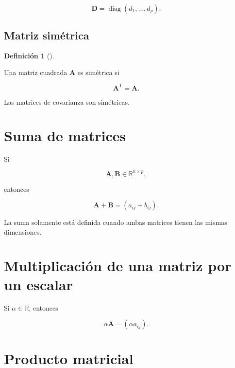 \documentclass[
  spanish,
  10.5pt,
  letterpaper,
  DIV=11,
  numbers=noendperiod,
  oneside,
  open=any]{scrreprt}
\theoremstyle{definition}
\newtheorem{definition}{Definición}[chapter]
\theoremstyle{definition}
\theoremstyle{plain}
\theoremstyle{remark}
\begin{document}
\[
\mathbf{D}
=
\operatorname{diag}(d_1,\ldots,d_p).
\]

\subsection*{Matriz simétrica}\label{matriz-simuxe9trica}

\begin{definition}[]\protect\hypertarget{def-matriz-simetrica}{}\label{def-matriz-simetrica}

Una matriz cuadrada \(\mathbf{A}\) es simétrica si

\[
\mathbf{A}^{\mathsf T}=\mathbf{A}.
\]

\end{definition}

Las matrices de covarianza son simétricas.

\section*{Suma de matrices}\label{suma-de-matrices}


Si

\[
\mathbf{A},\mathbf{B}\in\mathbb{R}^{n\times p},
\]

entonces

\[
\mathbf{A}+\mathbf{B}
=
(a_{ij}+b_{ij}).
\]

La suma solamente está definida cuando ambas matrices tienen las mismas
dimensiones.

\section*{Multiplicación de una matriz por un
escalar}\label{multiplicaciuxf3n-de-una-matriz-por-un-escalar}


Si \(\alpha\in\mathbb{R}\), entonces

\[
\alpha\mathbf{A}
=
(\alpha a_{ij}).
\]

\section*{Producto matricial}\label{producto-matricial}
\end{document}
